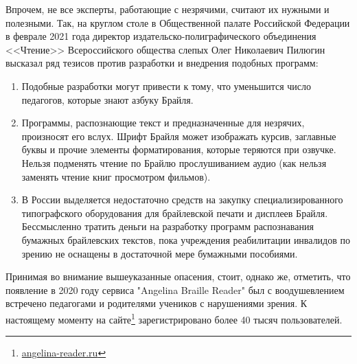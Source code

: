 \documentclass{main.tex}[subfiles]
\begin{document}
Впрочем, не все эксперты, работающие с незрячими, считают их нужными и полезными.
Так, на круглом столе в Общественной палате Российской Федерации в феврале 2021 года директор издательско-полиграфического объединения <<Чтение>> Всероссийского общества слепых Олег Николаевич Пилюгин высказал ряд тезисов против разработки и внедрения подобных программ:
\begin{enumerate}[noitemsep]
    \item Подобные разработки могут привести к тому, что уменьшится число педагогов, которые знают азбуку Брайля.
    \item Программы, распознающие текст и предназначенные для незрячих, произносят его вслух.
    Шрифт Брайля может изображать курсив, заглавные буквы и прочие элементы форматирования, которые теряются при озвучке.
    Нельзя подменять чтение по Брайлю прослушиванием аудио (как нельзя заменять чтение книг просмотром фильмов).
    \item В России выделяется недостаточно средств на закупку специализированного типографского оборудования для брайлевской печати и дисплеев Брайля.
    Бессмысленно тратить деньги на разработку программ распознавания бумажных брайлевских текстов, пока учреждения реабилитации инвалидов по зрению не оснащены в достаточной мере бумажными пособиями.
\end{enumerate}

Принимая во внимание вышеуказанные опасения, стоит, однако же, отметить, что появление в 2020 году сервиса "Angelina Braille Reader"\hspace{0pt} был с воодушевлением встречено педагогами и родителями учеников с нарушениями зрения.
К настоящему моменту на сайте\footnote{\href{http://angelina-reader.ru}{angelina-reader.ru}} зарегистрировано более 40 тысяч пользователей.
\end{document}
